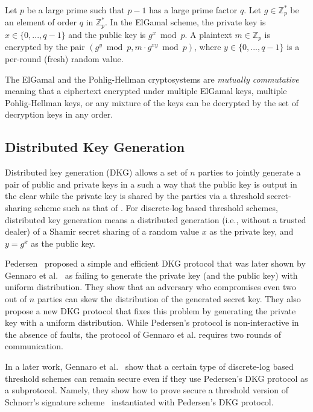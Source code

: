 \documentclass[11pt]{article}
\theoremstyle{plain}
\begin{document}
Let $p$ be a large prime such that $p-1$ has a large prime factor
$q$. Let $g\in\mathbb{Z}_{p}^{*}$ be an element of order $q$ in
$\mathbb{Z}_{p}^{*}$. In the ElGamal scheme, the private key is $x\in\{0,...,q-1\}$
and the public key is $g^{x}\bmod p$. A plaintext $m\in\mathbb{Z}_{p}$
is encrypted by the pair $(g^{y}\bmod p,m\cdot g^{xy}\bmod p)$, where
$y\in\{0,...,q-1\}$ is a per-round (fresh) random value. 

The ElGamal and the Pohlig-Hellman cryptosystems are \emph{mutually
	commutative} meaning that a ciphertext encrypted under multiple ElGamal
keys, multiple Pohlig-Hellman keys, or any mixture of the keys can
be decrypted by the set of decryption keys in any order.

\subsection{Distributed Key Generation}

Distributed key generation (DKG) allows a set of $n$ parties to jointly
generate a pair of public and private keys in a such a way that the
public key is output in the clear while the private key is shared
by the parties via a threshold secret-sharing scheme such as that
of \cite{shamir:how}. For discrete-log based threshold schemes, distributed
key generation means a distributed generation (i.e., without a trusted
dealer) of a Shamir secret sharing \cite{shamir:how} of a random
value $x$ as the private key, and $y=g^{x}$ as the public key.

Pedersen~\cite{pedersen1991threshold} proposed a simple and efficient
DKG protocol that was later shown by Gennaro et al.~\cite{Gennaro1999}
as failing to generate the private key (and the public key) with uniform
distribution. They show that an adversary who compromises even two
out of $n$ parties can skew the distribution of the generated secret
key. They also propose a new DKG protocol that fixes this problem
by generating the private key with a uniform distribution. While Pedersen\textquoteright s
protocol is non-interactive in the absence of faults, the protocol
of Gennaro et al. requires two rounds of communication.

In a later work, Gennaro et al.~\cite{Gennaro03revisitingthe} show
that a certain type of discrete-log based threshold schemes can remain
secure even if they use Pedersen\textquoteright s DKG protocol as
a subprotocol. Namely, they show how to prove secure a threshold version
of Schnorr\textquoteright s signature scheme~\cite{Schnorr:1989:EIS:646754.705037}
instantiated with Pedersen\textquoteright s DKG protocol.
\end{document}
